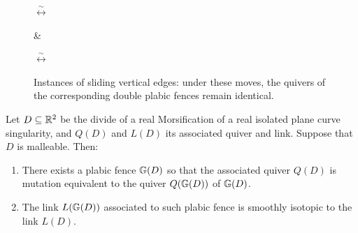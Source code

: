 \begin{figure}
    \quad $\stackrel{\sim}{\longleftrightarrow}$ \quad
    \quad \quad \& \quad \quad 
    \quad $\stackrel{\sim}{\longleftrightarrow}$ \quad
    \caption{Instances of sliding vertical edges: under these moves, the quivers of the corresponding double plabic fences remain identical.}
    \label{fig:sliding}
\end{figure}


\begin{lemma}\label{lem:malleable_to_plabic_fence}
Let $D\subseteq\mathbb R^2$ be the divide of a real Morsification of a real isolated plane curve singularity, and $Q(D)$ and $L(D)$ its associated quiver and link. Suppose that $D$ is malleable. Then:
\begin{enumerate}[label=$(\roman*)$]
    \item There exists a plabic fence $\mathbb G(D)$ so that the associated quiver $Q(D)$ is mutation equivalent to the quiver $Q(\mathbb G(D))$ of $\mathbb G(D)$.\\

    \item The link $L(\mathbb G(D))$ associated to such plabic fence is smoothly isotopic to the link $L(D)$.
\end{enumerate}
\end{lemma}

